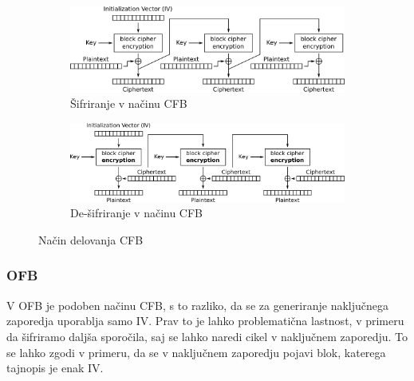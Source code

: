 \documentclass[12pt,a4paper,openany]{book}
\begin{document}
\begin{figure}[ht!]
  \centering
  \begin{subfigure}[b]{\textwidth}
    \includegraphics[width=\textwidth]{images/CFB_encryption}
    \caption{Šifriranje v načinu CFB}
\label{fig:cfbenc}
  \end{subfigure}
  \begin{subfigure}[b]{\textwidth}
    \includegraphics[width=\textwidth]{images/CFB_decryption}
    \caption{De-šifriranje v načinu CFB}
\label{fig:cfbdec}
  \end{subfigure}
  \caption{Način delovanja \gls{CFB}}
\label{fig:cfbmode}
\end{figure}



\subsubsection{OFB}
\label{subs:OFB}

V \gls{OFB} je podoben načinu \gls{CFB}, s to razliko, da se za generiranje naključnega zaporedja uporablja samo \gls{IV}. Prav to je lahko problematična lastnost, v primeru da šifriramo daljša sporočila, saj se lahko naredi cikel v naključnem zaporedju. To se lahko zgodi v primeru, da se v naključnem zaporedju pojavi blok, katerega tajnopis je enak IV.\@
\end{document}
